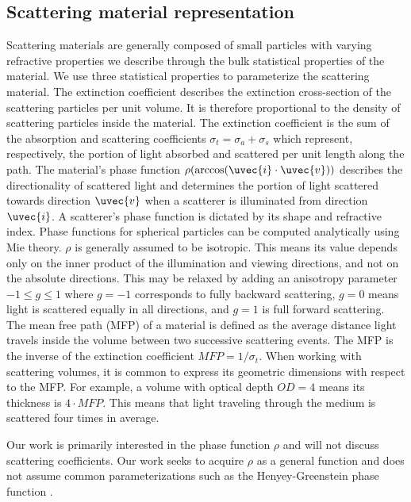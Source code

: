 \subsection{Scattering material representation}
Scattering materials are generally composed of small particles with varying refractive properties we describe through the bulk statistical properties of the material. We use three statistical properties to parameterize the scattering material. The extinction coefficient describes the extinction cross-section of the scattering particles per unit volume. It is therefore proportional to the density of scattering particles inside the material. The extinction coefficient is the sum of the absorption and scattering coefficients $\sigma_t = \sigma_a + \sigma_s$ which represent, respectively, the portion of light absorbed and scattered per unit length along the path. The material's phase function $\rho(\arccos(\uvec{i} \cdot \uvec{v}))$ describes the directionality of scattered light and determines the portion of light scattered towards direction $\uvec{v}$ when a scatterer is illuminated from direction $\uvec{i}$. A scatterer's phase function is dictated by its shape and refractive index. Phase functions for spherical particles can be computed analytically using Mie theory\cite{bohren2008absorption, frisvad2007computing, hulst1981light}. $\rho$ is generally assumed to be isotropic. This means its value depends only on the inner product of the illumination and viewing directions, and not on the absolute directions. This may be relaxed by adding an anisotropy parameter $-1 \leq g \leq 1$ where $g=-1$ corresponds to fully backward scattering, $g=0$ means light is scattered equally in all directions, and $g=1$ is full forward scattering. The mean free path (MFP) of a material is defined as the average distance light travels inside the volume between two successive scattering events. The MFP is the inverse of the extinction coefficient $MFP=1/\sigma_t$. When working with scattering volumes, it is common to express its geometric dimensions with respect to the MFP. For example, a volume with optical depth $OD = 4$ means its thickness is $4 \cdot MFP$. This means that light traveling through the medium is scattered four times in average.

Our work is primarily interested in the phase function $\rho$ and will not discuss scattering coefficients. Our work seeks to acquire $\rho$ as a general function and does not assume common parameterizations such as the Henyey-Greenstein phase function \cite{henyey1940diffuse}.

